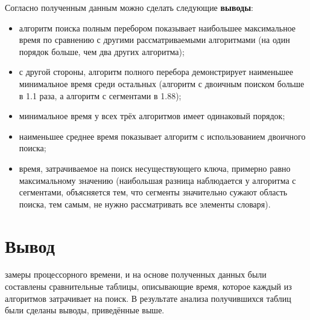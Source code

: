 Согласно полученным данным можно сделать следующие \textbf{выводы}:
\begin{itemize}
	\item алгоритм поиска полным перебором показывает наибольшее максимальное время по сравнению с другими рассматриваемыми алгоритмами (на один порядок больше, чем два других алгоритма);
	\item с другой стороны, алгоритм полного перебора демонстрирует наименьшее минимальное время среди остальных (алгоритм с двоичным поиском больше в 1.1 раза, а алгоритм с сегментами в 1.88);
	\item минимальное время у всех трёх алгоритмов имеет одинаковый порядок;
	\item наименьшее среднее время показывает алгоритм с использованием двоичного поиска;
	\item время, затрачиваемое на поиск несуществующего ключа, примерно равно максимальному значению (наибольшая разница наблюдается у алгоритма с сегментами, объясняется тем, что сегменты значительно сужают область поиска, тем самым, не нужно рассматривать все элементы словаря).
\end{itemize}

\section*{Вывод}
 замеры процессорного времени, и на основе полученных данных были составлены сравнительные таблицы, описывающие время, которое каждый из алгоритмов затрачивает на поиск. В результате анализа получившихся таблиц были сделаны выводы, приведённые выше.
